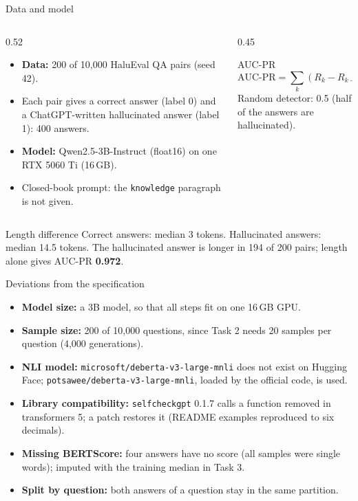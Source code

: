 \documentclass[aspectratio=169,10pt]{beamer}
\begin{document}
\begin{frame}{Data and model}
\begin{columns}[T]
\begin{column}{0.52\textwidth}
\begin{itemize}
  \item \textbf{Data:} 200 of 10{,}000 HaluEval QA pairs (seed 42).
  \item Each pair gives a correct answer (label 0) and a ChatGPT-written hallucinated answer
        (label 1): 400 answers.
  \item \textbf{Model:} Qwen2.5-3B-Instruct (float16) on one RTX 5060 Ti (16\,GB).
  \item Closed-book prompt: the \texttt{knowledge} paragraph is not given.
\end{itemize}
\end{column}
\begin{column}{0.45\textwidth}
\begin{block}{AUC-PR}
\[
\text{AUC-PR} = \sum_k (R_k - R_{k-1})\, P_k
\]
Random detector: 0.5 (half of the answers are hallucinated).
\end{block}
\end{column}
\end{columns}

\vspace{6pt}
\begin{alertblock}{Length difference}
Correct answers: median 3 tokens. Hallucinated answers: median 14.5 tokens.
The hallucinated answer is longer in 194 of 200 pairs; length alone gives AUC-PR \textbf{0.972}.
\end{alertblock}
\end{frame}

\begin{frame}{Deviations from the specification}
\begin{itemize}
  \item \textbf{Model size:} a 3B model, so that all steps fit on one 16\,GB GPU.
  \item \textbf{Sample size:} 200 of 10{,}000 questions, since Task 2 needs 20 samples per question
        (4{,}000 generations).
  \item \textbf{NLI model:} \texttt{microsoft/deberta-v3-large-mnli} does not exist on Hugging Face;
        \texttt{potsawee/deberta-v3-large-mnli}, loaded by the official code, is used.
  \item \textbf{Library compatibility:} \texttt{selfcheckgpt} 0.1.7 calls a function removed in
        transformers 5; a patch restores it (README examples reproduced to six decimals).
  \item \textbf{Missing BERTScore:} four answers have no score (all samples were single words);
        imputed with the training median in Task 3.
  \item \textbf{Split by question:} both answers of a question stay in the same partition.
\end{itemize}
\end{frame}
\end{document}
